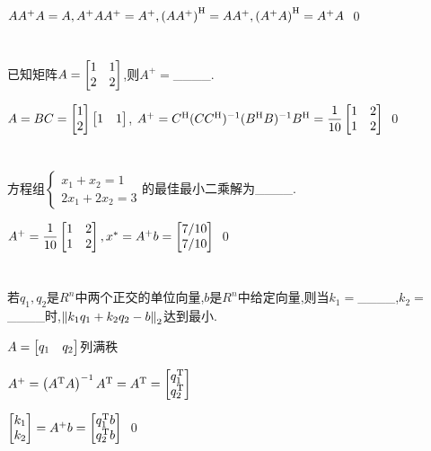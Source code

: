 \documentclass{matrix-homework}
\begin{document}
\answer
$AA^+A=A, A^+AA^+=A^+, \left(AA^+\right)^{\mathrm{H}}=AA^+, \left(A^+A\right)^{\mathrm{H}}=A^+A$
\qed


\section{}
已知矩阵$A=\begin{bmatrix}1&1\\2&2\end{bmatrix}$,则$A^+=$\_\_\_\_.

\answer
$A=BC=\begin{bmatrix}1\\2\end{bmatrix}\begin{bmatrix}1&1\end{bmatrix}$, $A^+=C^{\mathrm{H}} (CC^{\mathrm{H}})^{-1}(B^{\mathrm{H}} B)^{-1}B^{\mathrm{H}}=\dfrac{1}{10}\begin{bmatrix}1&2\\1&2\end{bmatrix}$
\qed


\section{}
方程组$\left\{\begin{array}{l}x_1+x_2=1 \\2x_1+2x_2=3\end{array}\right.$的最佳最小二乘解为\_\_\_\_.

\answer
$A^+=\dfrac{1}{10}\begin{bmatrix}1&2\\1&2\end{bmatrix}, x^*=A^+b=\begin{bmatrix}7/10\\7/10\end{bmatrix}$
\qed


\section{}
若$q_1,q_2$是$R^n$中两个正交的单位向量,$b$是$R^n$中给定向量,则当$k_1=$\_\_\_\_,$k_2=$\_\_\_\_时,$\left\lVert k_1q_1+k_2q_2-b \right\rVert_2$达到最小.

\answer
$A=\begin{bmatrix}q_1&q_2\end{bmatrix}$列满秩

$A^+=\left(A^{\mathrm{T}} A\right)^{-1}A^{\mathrm{T}}=A^{\mathrm{T}}=\begin{bmatrix}q_1^{\mathrm{T}} \\ q_2^{\mathrm{T}}\end{bmatrix}$

$\begin{bmatrix}k_1\\k_2\end{bmatrix}=A^+b=\begin{bmatrix}q_1^{\mathrm{T}} b\\ q_2^{\mathrm{T}} b\end{bmatrix}$
\qed
\end{document}
